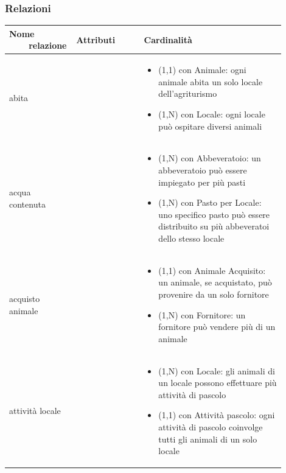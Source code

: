 \documentclass[12pt,a4paper]{article}
\begin{document}
\subsubsection{Relazioni}
\label{Allevamento Relazioni}
\begin{center}

\setlength{\extrarowheight}{1.5pt}

\begin{longtable}{|p{0.16\linewidth}|p{0.24\linewidth}|p{0.50\linewidth}|}
\hline 
\textbf{Nome \ \ \ \ relazione} 	& \textbf{Attributi} & \textbf{Cardinalità}\\ 

    
\hline
abita				&   
					& \begin{itemize}
						\setlength{\itemindent}{-1em}
						\vspace{-15pt}
						\setlength\itemsep{-0.25em}
						\item (1,1) con Animale: ogni animale abita un solo locale dell'agriturismo
						\item (1,N) con Locale: ogni locale può ospitare diversi animali
					\end{itemize}\\ 

\hline
acqua contenuta 				&   
					& \begin{itemize}
						\setlength{\itemindent}{-1em}
						\vspace{-25pt}
						\setlength\itemsep{-0.25em}
						\item (1,N) con Abbeveratoio: un abbeveratoio può essere impiegato per più pasti
						\item (1,N) con Pasto per Locale: uno specifico pasto può essere distribuito su più abbeveratoi dello stesso locale
					\end{itemize}\\ 

\hline
acquisto animale 				&   
					& \begin{itemize}
						\setlength{\itemindent}{-1em}
						\vspace{-25pt}
						\setlength\itemsep{-0.25em}
						\item (1,1) con Animale Acquisito: un animale, se acquistato, può provenire da un solo fornitore
						\item (1,N) con Fornitore: un fornitore può vendere più di un animale
					\end{itemize}\\ 

\hline
attività locale 				&   
					& \begin{itemize}
						\setlength{\itemindent}{-1em}
						\vspace{-25pt}
						\setlength\itemsep{-0.25em}
						\item (1,N) con Locale: gli animali di un locale possono effettuare più attività di pascolo
						\item (1,1) con Attività pascolo: ogni attività di pascolo coinvolge tutti gli animali di un solo locale
					\end{itemize}\\ 


\end{longtable}
\end{center}
\end{document}
